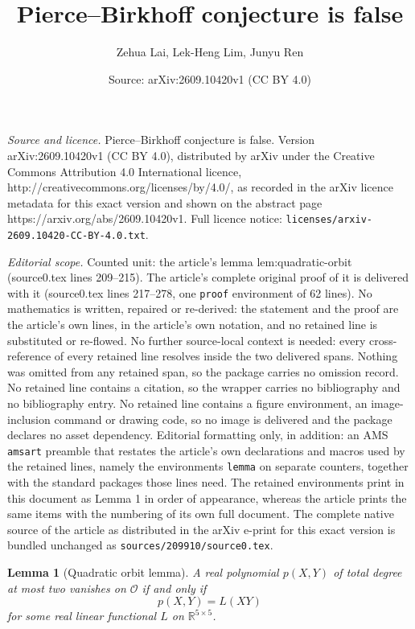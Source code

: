 \documentclass[10pt,a4paper]{amsart}
\title{Pierce--Birkhoff conjecture is false}
\author{Zehua Lai, Lek-Heng Lim, Junyu Ren}
\date{Source: arXiv:2609.10420v1 (CC BY 4.0)}
\newtheorem{lemma}{Lemma}
\begin{document}
\maketitle

\noindent\emph{Source and licence.} Pierce--Birkhoff conjecture is false. Version arXiv:2609.10420v1 (CC BY 4.0), distributed by arXiv under the Creative Commons Attribution 4.0 International licence, http://creativecommons.org/licenses/by/4.0/, as recorded in the arXiv licence metadata for this exact version and shown on the abstract page https://arxiv.org/abs/2609.10420v1. Full licence notice: \texttt{licenses/arxiv-2609.10420-CC-BY-4.0.txt}.\par\smallskip

\noindent\textit{Editorial scope.} Counted unit: the article's lemma lem:quadratic-orbit (source0.tex lines 209--215). The article's complete original proof of it is delivered with it (source0.tex lines 217--278, one \texttt{proof} environment of 62 lines). No mathematics is written, repaired or re-derived: the statement and the proof are the article's own lines, in the article's own notation, and no retained line is substituted or re-flowed.  No further source-local context is needed: every cross-reference of every retained line resolves inside the two delivered spans.  Nothing was omitted from any retained span, so the package carries no omission record.  No retained line contains a citation, so the wrapper carries no bibliography and no bibliography entry.  No retained line contains a figure environment, an image-inclusion command or drawing code, so no image is delivered and the package declares no asset dependency.  Editorial formatting only, in addition: an AMS \texttt{amsart} preamble that restates the article's own declarations and macros used by the retained lines, namely the environments \texttt{lemma} on separate counters, together with the standard packages those lines need.  The retained environments print in this document as Lemma 1 in order of appearance, whereas the article prints the same items with the numbering of its own full document.  The complete native source of the article as distributed in the arXiv e-print for this exact version is bundled unchanged as \texttt{sources/209910/source0.tex}.
\begin{lemma}[Quadratic orbit lemma]\label{lem:quadratic-orbit}
A real polynomial $p(X,Y)$ of total degree at most two vanishes on $\mathcal O$ if and only if
\[
p(X,Y)=L(XY)
\]
for some real linear functional $L$ on $\mathbb{R}^{5 \times 5}$.
\end{lemma}
\end{document}

